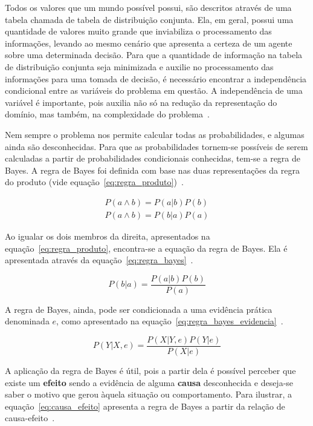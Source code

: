 Todos os valores que um mundo possível possui, são descritos através de uma tabela chamada de tabela de distribuição conjunta. Ela, em geral, possui uma quantidade de valores muito grande que inviabiliza o processamento das informações, levando ao mesmo cenário que apresenta a certeza de um agente sobre uma determinada decisão. Para que a quantidade de informação na tabela de distribuição conjunta seja minimizada e auxilie no processamento das informações para uma tomada de decisão, é necessário encontrar a independência condicional entre as variáveis do problema em questão. A independência de uma variável é importante, pois auxilia não só na redução da representação do domínio, mas também, na complexidade do problema~\cite{russell:2002, faceli:2011}.

Nem sempre o problema nos permite calcular todas as probabilidades, e algumas ainda são desconhecidas. Para que as probabilidades tornem-se possíveis de serem calculadas a partir de probabilidades condicionais conhecidas, tem-se a regra de Bayes. A regra de Bayes foi definida com base nas duas representações da regra do produto (vide equação~\ref{eq:regra_produto})~\cite{russell:2002}.

\begin{subequations}
    \label{eq:regra_produto}
    \begin{align}
        P(a \land b) = P(a|b)P(b)\\
        P(a \land b) = P(b|a)P(a)
    \end{align}
\end{subequations}

Ao igualar os dois membros da direita, apresentados na equação~\ref{eq:regra_produto}, encontra-se a equação da regra de Bayes. Ela é apresentada através da equação~\ref{eq:regra_bayes}~\cite{russell:2002}.

\begin{equation}
    \label{eq:regra_bayes}
    P(b|a) = \frac{P(a|b)P(b)}{P(a)}
\end{equation}

A regra de Bayes, ainda, pode ser condicionada a uma evidência prática denominada $e$, como apresentado na equação~\ref{eq:regra_bayes_evidencia}~\cite{russell:2002}.

\begin{equation}
    \label{eq:regra_bayes_evidencia}
    P(Y|X, e) = \frac{P(X|Y, e)P(Y|e)}{P(X|e)}
\end{equation}

A aplicação da regra de Bayes é útil, pois a partir dela é possível perceber que existe um \textbf{efeito} sendo a evidência de alguma \textbf{causa} desconhecida e deseja-se saber o motivo que gerou àquela situação ou comportamento. Para ilustrar, a equação~\ref{eq:causa_efeito} apresenta a regra de Bayes a partir da relação de causa-efeito~\cite{russell:2002}.

